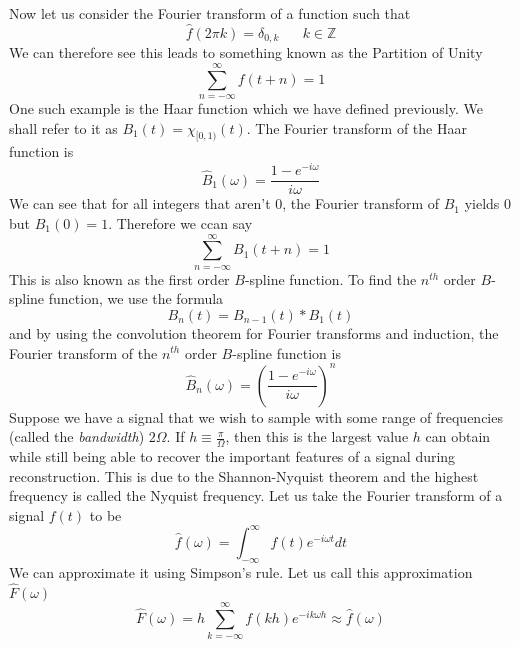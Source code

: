 \documentclass{report}
\theoremstyle{definition}
\theoremstyle{remark}
\newcommand{\twen}{\hspace{20pt}}
\begin{document}
Now let us consider the Fourier transform of a function such that 
\begin{equation*}
    \hat f(2\pi k) = \delta_{0,k} \twen k\in\mathbb{Z}
\end{equation*}
We can therefore see this leads to something known as the Partition of Unity 
\begin{equation*}
    \sum^\infty_{n=-\infty}f(t+n) = 1
\end{equation*}
One such example is the Haar function which we have defined previously. We shall refer to it as $B_1(t) = \chi_{[0,1)}(t)$. The Fourier transform of the Haar function is 
\begin{equation*}
    \hat B_1(\omega) = \frac{1-e^{-i\omega}}{i\omega}
\end{equation*}
We can see that for all integers that aren't 0, the Fourier transform of $B_1$ yields 0 but $\hat B_1(0) =1$. Therefore we ccan say 
\begin{equation*}
    \sum^\infty_{n=-\infty}B_1(t+n)=1
\end{equation*}
This is also known as the first order $B$-spline function. To find the $n^{th}$ order $B$-spline function, we use the formula 
\begin{equation*}
    B_n(t) =B_{n-1}(t)*B_1(t)
\end{equation*}
and by using the convolution theorem for Fourier transforms and induction, the Fourier transform of the $n^{th}$ order $B$-spline function is 
\begin{equation*}
    \hat B_n(\omega) = \left(\frac{1-e^{-i\omega}}{i\omega}\right)^n
\end{equation*}
Suppose we have a signal that we wish to sample with some range of frequencies (called the \textit{bandwidth}) $2\Omega$. If $h\equiv \frac{\pi}{\Omega}$, then this is the largest value $h$ can obtain while still being able to recover the important features of a signal during reconstruction. This is due to the Shannon-Nyquist theorem and the highest frequency is called the Nyquist frequency. Let us take the Fourier transform of a signal $f(t)$ to be 
\begin{equation*}
    \hat f(\omega) = \int^\infty_{-\infty}f(t)e^{-i\omega t}dt
\end{equation*}
We can approximate it using Simpson's rule. Let us call this approximation $\hat F(\omega)$
\begin{equation*}
    \hat F(\omega) = h\sum^\infty_{k=-\infty}f(kh)e^{-ik\omega h} \approx \hat f(\omega)
\end{equation*}
\end{document}
